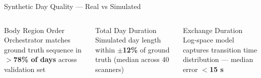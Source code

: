 \documentclass[aspectratio=169,12pt]{beamer}
\begin{document}
\begin{frame}[shrink=10]{Synthetic Day Quality — Real vs Simulated}
\vspace{10pt}
\begin{columns}[T]
\begin{block}{Body Region Order}
  Orchestrator matches ground truth sequence in \textbf{$>$78\% of days} across validation set
\end{block}
\begin{exampleblock}{Total Day Duration}
  Simulated day length within \textbf{$\pm$12\%} of ground truth (median across 40 scanners)
\end{exampleblock}
\begin{block}{Exchange Duration}
  Log-space model captures transition time distribution — median error \textbf{$<$15 s}
\end{block}
\end{columns}
\end{frame}
\end{document}
